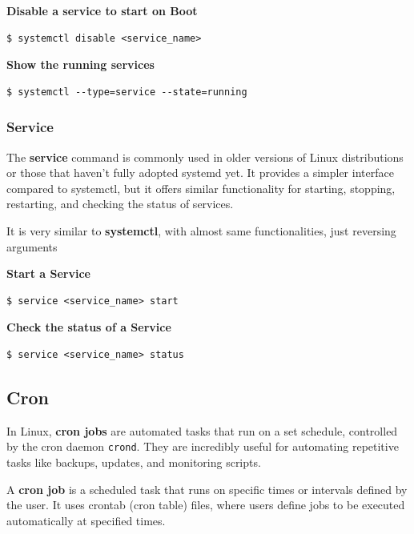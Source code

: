 \documentclass{article}
\newenvironment{codetemplate}[1][]{%
  \mybasecolorbox[#1]
  \itshape
}{%
  \endmybasecolorbox
}
\begin{document}
\textbf{Disable a service to start on Boot}
\begin{codetemplate}{}
\begin{verbatim}
$ systemctl disable <service_name>
\end{verbatim}
\end{codetemplate}

\textbf{Show the running services}
\begin{codetemplate}{}
\begin{verbatim}
$ systemctl --type=service --state=running
\end{verbatim}
\end{codetemplate}

\subsubsection{Service}
The \textbf{service} command is commonly used in older versions of Linux distributions or those that haven't fully adopted systemd yet. It provides a simpler interface compared to systemctl, but it offers similar functionality for starting, stopping, restarting, and checking the status of services.

It is very similar to \textbf{systemctl}, with almost same functionalities, just reversing arguments

\textbf{Start a Service}
\begin{codetemplate}{}
\begin{verbatim}
$ service <service_name> start
\end{verbatim}
\end{codetemplate}

\textbf{Check the status of a Service}
\begin{codetemplate}{}
\begin{verbatim}
$ service <service_name> status
\end{verbatim}
\end{codetemplate}

\subsection{Cron}
In Linux, \textbf{cron jobs} are automated tasks that run on a set schedule, controlled by the cron daemon \verb|crond|. 
They are incredibly useful for automating repetitive tasks like backups, updates, and monitoring scripts.

A \textbf{cron job} is a scheduled task that runs on specific times or intervals defined by the user. It uses crontab (cron table) files, where users define jobs to be executed automatically at specified times.
\end{document}
